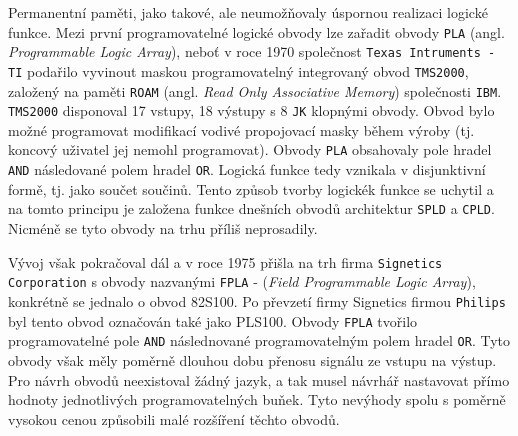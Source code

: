       Permanentní paměti, jako takové, ale neumožňovaly úspornou realizaci logické fun\-kce. Mezi
      první programovatelné logické obvody lze zařadit obvody \texttt{PLA} (angl.
      \emph{Programmable Logic Array}), neboť v roce 1970 společnost \texttt{Texas Intruments - TI}
      podařilo vyvinout maskou programovatelný integrovaný obvod \texttt{TMS2000}, založený na
      paměti \texttt{ROAM} (angl. \emph{Read Only Associative Memory}) společnosti \texttt{IBM}.
      \texttt{TMS2000} disponoval 17 vstupy, 18 výstupy s 8 \texttt{JK} klopnými obvody. Obvod bylo
      možné programovat modifikací vodivé propojovací masky během výroby (tj. koncový uživatel jej
      nemohl programovat). Obvody \texttt{PLA} obsahovaly pole hradel \texttt{AND} následované
      polem hradel \texttt{OR}. Logická funkce tedy vznikala v disjunktivní formě, tj. jako součet
      součinů. Tento způsob tvorby logickék funkce se uchytil a na tomto principu je založena
      funkce dnešních obvodů architektur \texttt{SPLD} a \texttt{CPLD}. Nicméně se tyto obvody na
      trhu příliš neprosadily.
      
      Vývoj však pokračoval dál a v roce 1975 přišla na trh firma \texttt{Signetics Corporation} s
      obvody nazvanými \texttt{FPLA} - (\emph{Field Programmable Logic Array}), konkrétně se
      jednalo o obvod 82S100. Po převzetí firmy Signetics firmou \texttt{Philips} byl tento obvod
      označován také jako PLS100. Obvody \texttt{FPLA} tvořilo programovatelné pole \texttt{AND}
      následnované programovatelným polem hradel \texttt{OR}. Tyto obvody však měly poměrně dlouhou
      dobu přenosu signálu ze vstupu na výstup. Pro návrh obvodů neexistoval žádný jazyk, a tak
      musel návrhář nastavovat přímo hodnoty jednotlivých programovatelných buňek. Tyto nevýhody
      spolu s poměrně vysokou cenou způsobili malé rozšíření těchto obvodů.
      
